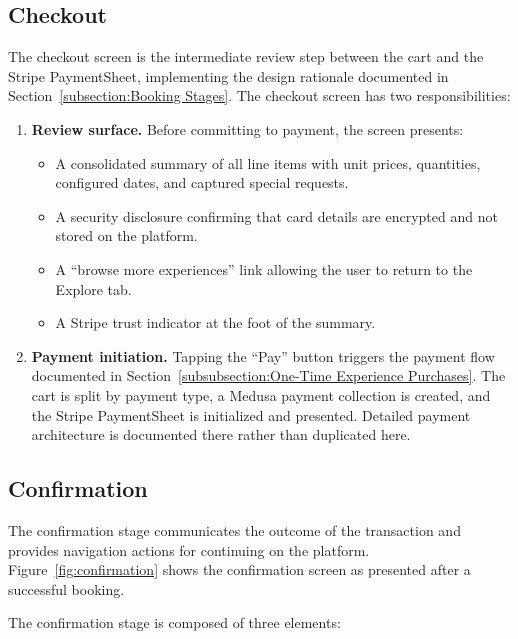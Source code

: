 \subsection{Checkout}
The checkout screen is the intermediate review step between the cart and the Stripe PaymentSheet, implementing the design rationale documented in Section~\ref{subsection:Booking Stages}.
The checkout screen has two responsibilities:
\begin{enumerate}
  \item \textbf{Review surface.} Before committing to payment, the screen presents:
  \begin{itemize}
    \item A consolidated summary of all line items with unit prices, quantities, configured dates, and captured special requests.
    \item A security disclosure confirming that card details are encrypted and not stored on the platform.
    \item A ``browse more experiences'' link allowing the user to return to the Explore tab.
    \item A Stripe trust indicator at the foot of the summary.
  \end{itemize}
  \item \textbf{Payment initiation.} Tapping the ``Pay'' button triggers the payment flow documented in Section~\ref{subsubsection:One-Time Experience Purchases}. The cart is split by payment type, a Medusa payment collection is created, and the Stripe PaymentSheet is initialized and presented. Detailed payment architecture is documented there rather than duplicated here.
\end{enumerate}
\newpage
\subsection{Confirmation}
The confirmation stage communicates the outcome of the transaction and provides navigation actions for continuing on the platform. Figure~\ref{fig:confirmation} shows the confirmation screen as presented after a successful booking.


The confirmation stage is composed of three elements:

